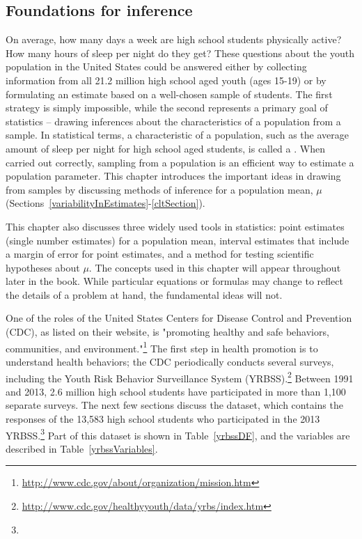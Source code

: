 
\begin{spacing}{1.5}

\chapter{Foundations for inference}
\label{foundationsForInference}

On average, how many days a week are high school students physically active? How many hours of sleep per night do they get? These questions about the youth population in the United States could be answered either by collecting information from all 21.2 million high school aged youth (ages 15-19) or by formulating an estimate based on a well-chosen sample of students. The first strategy is simply impossible, while the second represents a primary goal of statistics -- drawing inferences about the characteristics of a population from a sample. In statistical terms, a characteristic of a population, such as the average amount of sleep per night for high school aged students, is called a . When carried out correctly, sampling from a population is an efficient way to estimate a population parameter. This chapter introduces the important ideas in drawing from samples by discussing methods of inference for a population mean, $\mu$ (Sections~\ref{variabilityInEstimates}-\ref{cltSection}). 

This chapter also discusses three widely used tools in statistics: point estimates (single number estimates) for a population mean, interval estimates that include a margin of error for point estimates, and a method for testing scientific hypotheses about $\mu$. The concepts used in this chapter will appear throughout later in the book. While particular equations or formulas may change to reflect the details of a problem at hand, the fundamental ideas will not. 


One of the roles of the United States Centers for Disease Control and Prevention (CDC), as listed on their website, is "promoting healthy and safe behaviors, communities, and environment."\footnote{\url{http://www.cdc.gov/about/organization/mission.htm}} The first step in health promotion is to understand health behaviors; the CDC periodically conducts several surveys, including the Youth Risk Behavior Surveillance System (YRBSS).\footnote{\url{http://www.cdc.gov/healthyyouth/data/yrbs/index.htm}} Between 1991 and 2013, 2.6 million high school students have participated in more than 1,100 separate surveys. The next few sections discuss the  dataset, which contains the responses of the 13,583 high school students who participated in the 2013 YRBSS.\footnote{} Part of this dataset is shown in Table~\ref{yrbssDF}, and the variables are described in Table~\ref{yrbssVariables}.


\end{spacing}
